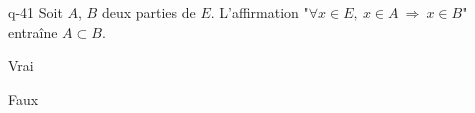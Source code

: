 \begin{truefalse}{q-41}
Soit $A$, $B$ deux parties de $E$. L'affirmation "$\forall x\in E,\ x\in A\  \Rightarrow \  x\in B$" entraîne $A\subset B$.
\item* Vrai
\item Faux
\end{truefalse}

